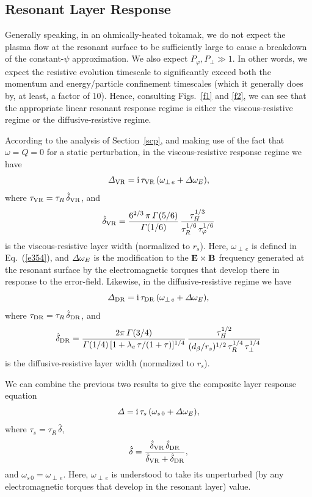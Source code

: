 \documentclass[12pt,prb,aps]{revtex4-1}
\begin{document}
\subsection{Resonant Layer Response}
Generally speaking, in an ohmically-heated tokamak, we do not expect the plasma flow at the resonant surface to be sufficiently
large to cause a breakdown of the constant-$\psi$ approximation. We also expect $P_\varphi, P_\perp \gg 1$. In other
words, we expect the resistive evolution timescale to significantly exceed both the momentum and energy/particle
confinement timescales (which it generally does by, at least, a factor of 10). Hence, consulting Figs.~\ref{f1} and \ref{f2},
we can see that the appropriate linear resonant response regime is either the viscous-resistive regime or the diffusive-resistive
regime. 

According to the analysis of Section~\ref{scp}, and making use of the fact that $\omega=Q=0$ for a static perturbation, 
in the viscous-resistive response regime we have
\begin{equation}
{\mit\Delta}_{\rm VR} = {\rm i}\,\tau_{\rm VR}\,(\omega_{\perp\,e}+{\mit\Delta}\omega_E),
\end{equation}
where $\tau_{\rm VR} = \tau_R\,\hat{\delta}_{\rm VR}$, and
\begin{equation}
\hat{\delta}_{\rm VR} = \frac{6^{2/3}\,\pi\,{\mit\Gamma}(5/6)}{{\mit\Gamma}(1/6)}\,\frac{\tau_H^{1/3}}{\tau_R^{1/6}\,\tau_\varphi^{1/6}}
\end{equation}
is the viscous-resistive layer width (normalized to $r_s$). Here, $\omega_{\perp\,e}$ is defined in Eq.~(\ref{e354}), and
${\mit\Delta}\omega_E$ is the modification to the ${\bf E}\times{\bf B}$ frequency generated at the resonant surface by
the electromagnetic torques that develop there in response to the error-field. Likewise, in the
diffusive-resistive regime we have
\begin{equation}
{\mit\Delta}_{\rm DR} = {\rm i}\,\tau_{\rm DR}\,(\omega_{\perp\,e}+{\mit\Delta}\omega_E),
\end{equation}
where $\tau_{\rm DR} = \tau_R\,\hat{\delta}_{\rm DR}$, and
\begin{equation}
\hat{\delta}_{\rm DR} = \frac{2\pi\,{\mit\Gamma}(3/4)}{{\mit\Gamma}(1/4)\,[1+\lambda_e\,\tau/(1+\tau)]^{1/4}}\,
\frac{\tau_H^{1/2}}{(d_\beta/r_s)^{1/2}\,\tau_R^{1/4}\,\tau_\perp^{1/4}}
\end{equation}
is the diffusive-resistive layer width (normalized to $r_s$).

We can combine the previous two results to give the composite layer response equation
\begin{equation}\label{e389}
{\mit\Delta} = {\rm i}\,\tau_s\,(\omega_{s\,0}+ {\mit\Delta}\omega_E),
\end{equation}
where $\tau_s=\tau_R\,\hat{\delta}$, 
\begin{equation}
\hat{\delta} = \frac{\hat{\delta}_{\rm VR}\,\hat{\delta}_{\rm DR}}{\hat{\delta}_{\rm VR} + \hat{\delta}_{\rm DR}},
\end{equation}
and 
$\omega_{s\,0}= \omega_{\perp\,e}$.
Here, $\omega_{\perp\,e}$ is understood to take its unperturbed (by any electromagnetic torques that
develop in the resonant layer) value. 
\end{document}
